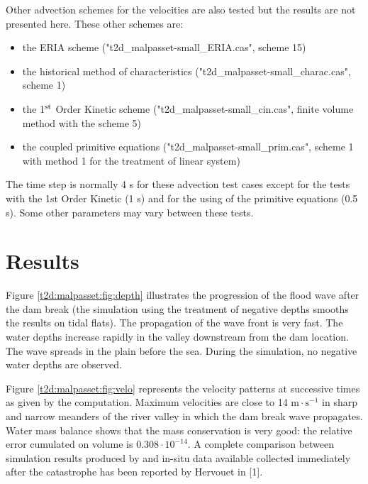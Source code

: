 \bigskip
Other advection schemes for the velocities are also tested but the results are not 
presented here. These other schemes are:
\begin{itemize}
\item the ERIA scheme ("t2d\_malpasset-small\_ERIA.cas", scheme 15)
\item the historical method of characteristics 
("t2d\_malpasset-small\_charac.cas", scheme 1)
\item the 1$^{\rm{st}}$ Order Kinetic scheme 
("t2d\_malpasset-small\_cin.cas", finite volume method with the scheme 5)
\item the coupled primitive equations 
("t2d\_malpasset-small\_prim.cas", scheme 1 with method 1 for the treatment of linear system)
\end{itemize}
The time step is normally 4 s for these advection test cases except for 
the tests with the 1st Order Kinetic (1 s) and for the using of the 
primitive equations (0.5 s). Some other parameters may vary between these tests. 
%
\section{Results}
%
Figure \ref{t2d:malpasset:fig:depth} illustrates the progression of the flood 
wave after the dam break (the simulation using the treatment of negative depths smooths
the results on tidal flats). The propagation of the wave front is very fast. 
The water depths increase rapidly in the valley downstream from the dam location. 
The wave spreads in the plain before the sea. During the simulation, 
no negative water depths are observed.

\bigskip
Figure \ref{t2d:malpasset:fig:velo} represents the velocity patterns at successive 
times as given by the computation. Maximum velocities are close to 14 $\text{m}\cdot\text{s}^{-1}$ 
in sharp and narrow meanders of the river valley in which the dam break wave propagates. 
Water mass balance shows that the mass conservation is very good: the relative error cumulated 
on volume is $0.308\cdot 10^{-14}$. %
A complete comparison between simulation results produced by  and in-situ data available 
collected immediately after the catastrophe has been reported by Hervouet in [1].

